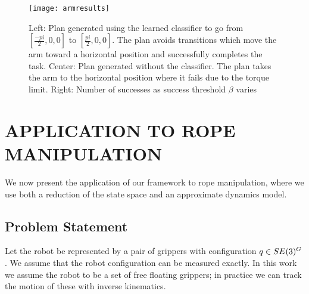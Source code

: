 \begin{figure}[t]
    \vspace{0.02in}
    \centering
    \texttt{[image: armresults]}
    \vspace{-0.1in}
    \caption{Left: Plan generated using the learned classifier to go from $[\frac{-pi}{2}, 0, 0]$ to $[\frac{pi}{2}, 0, 0]$. The plan avoids transitions which move the arm toward a horizontal position and successfully completes the task. Center: Plan generated without the classifier. The plan takes the arm to the horizontal position where it fails due to the torque limit. Right: Number of successes as success threshold $\beta$ varies}
    \label{fig:planar_arm}
\end{figure}







\section{APPLICATION TO ROPE MANIPULATION}


We now present the application of our framework to rope manipulation, where we use both a reduction of the state space and an approximate dynamics model.


\subsection{Problem Statement}



Let the robot be represented by a pair of grippers with configuration $q \in SE(3)^G$. We assume that the robot configuration can be measured exactly. In this work we assume the robot to be a set of free floating grippers; in practice we can track the motion of these with inverse kinematics.

